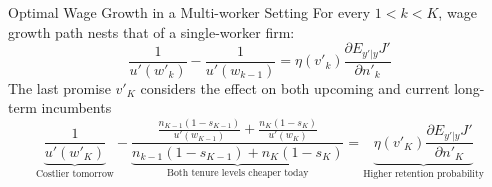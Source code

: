 \documentclass[9pt,aspectratio=169]{beamer} %
\begin{document}
\begin{frame}[noframenumbering]{Optimal Wage Growth in a Multi-worker Setting}
 \hypertarget{Wage K}{}
For every $1<k<K$, wage growth path nests that of a single-worker firm:
\[\frac{1}{u'(w'_{k})}-\frac{1}{u'(w_{k-1})}=\eta(v'_{k})\frac{\partial E_{y'|y}J'}{\partial n'_{k}}\]
The last promise $v'_K$ considers the effect on both upcoming and current long-term incumbents
\[\underbrace{\frac{1}{u'(w'_{K})}}_{\text{Costlier tomorrow}}-\underbrace{\frac{\frac{n_{K-1}(1-s_{K-1})}{u'(w_{K-1})}+\frac{n_{K}(1-s_{K})}{u'(w_{K})}}{n_{k-1}(1-s_{K-1})+n_K(1-s_K)}}_{\text{Both tenure levels cheaper today}}=\underbrace{\eta(v'_{K})\frac{\partial E_{y'|y}J'}{\partial n'_{K}}}_{\text{Higher retention probability}}\]
\hyperlink{Wage}{}
\end{frame}
\end{document}
